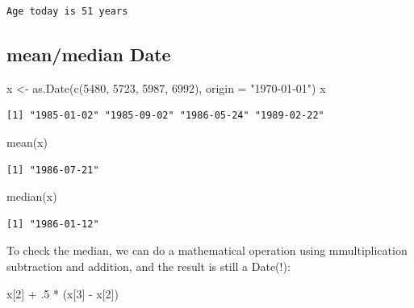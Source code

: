 \documentclass[
]{book}
\newenvironment{Shaded}{\begin{snugshade}}{\end{snugshade}}
\newcommand{\AttributeTok}[1]{\textcolor[rgb]{0.77,0.63,0.00}{#1}}
\newcommand{\DecValTok}[1]{\textcolor[rgb]{0.00,0.00,0.81}{#1}}
\newcommand{\FunctionTok}[1]{\textcolor[rgb]{0.00,0.00,0.00}{#1}}
\newcommand{\NormalTok}[1]{#1}
\newcommand{\OtherTok}[1]{\textcolor[rgb]{0.56,0.35,0.01}{#1}}
\newcommand{\SpecialCharTok}[1]{\textcolor[rgb]{0.00,0.00,0.00}{#1}}
\newcommand{\StringTok}[1]{\textcolor[rgb]{0.31,0.60,0.02}{#1}}
\begin{document}
\begin{verbatim}
Age today is 51 years
\end{verbatim}

\hypertarget{meanmedian-date}{%
\subsection{mean/median Date}\label{meanmedian-date}}

\begin{Shaded}
\begin{Highlighting}[]
\NormalTok{x }\OtherTok{\textless{}{-}} \FunctionTok{as.Date}\NormalTok{(}\FunctionTok{c}\NormalTok{(}\DecValTok{5480}\NormalTok{, }\DecValTok{5723}\NormalTok{, }\DecValTok{5987}\NormalTok{, }\DecValTok{6992}\NormalTok{), }\AttributeTok{origin =} \StringTok{"1970{-}01{-}01"}\NormalTok{)}
\NormalTok{x}
\end{Highlighting}
\end{Shaded}

\begin{verbatim}
[1] "1985-01-02" "1985-09-02" "1986-05-24" "1989-02-22"
\end{verbatim}

\begin{Shaded}
\begin{Highlighting}[]
\FunctionTok{mean}\NormalTok{(x)}
\end{Highlighting}
\end{Shaded}

\begin{verbatim}
[1] "1986-07-21"
\end{verbatim}

\begin{Shaded}
\begin{Highlighting}[]
\FunctionTok{median}\NormalTok{(x)}
\end{Highlighting}
\end{Shaded}

\begin{verbatim}
[1] "1986-01-12"
\end{verbatim}

To check the median, we can do a mathematical operation using mmultiplication subtraction and addition, and the result is still a Date(!):

\begin{Shaded}
\begin{Highlighting}[]
\NormalTok{x[}\DecValTok{2}\NormalTok{] }\SpecialCharTok{+}\NormalTok{ .}\DecValTok{5} \SpecialCharTok{*}\NormalTok{ (x[}\DecValTok{3}\NormalTok{] }\SpecialCharTok{{-}}\NormalTok{ x[}\DecValTok{2}\NormalTok{])}
\end{Highlighting}
\end{Shaded}
\end{document}
